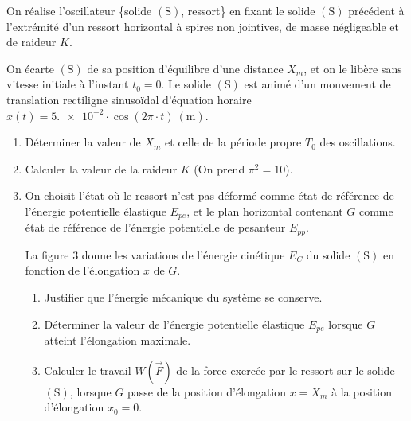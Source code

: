 On réalise l'oscillateur \{solide $\mathrm{(S)}$, ressort\} en fixant le solide
$\mathrm{(S)}$ précédent à l'extrémité d'un ressort horizontal à spires non
jointives, de masse négligeable et de raideur $K$.

On écarte $\mathrm{(S)}$ de sa position d'équilibre d'une distance $X_{m}$, et
on le libère sans vitesse initiale à l'instant $t_{0}=0$. Le solide
$\mathrm{(S)}$ est animé d'un mouvement de translation rectiligne sinusoïdal
d'équation horaire ${x(t)=\num{5.e-2}\cdot\cos(2\pi\cdot t)~(\unit{\m})}$.

\vspace{3mm}
\begin{minipage}{0.60\linewidth}
    \begin{enumerate}
        \item Déterminer la valeur de $X_{m}$ et celle de la période propre $T_{0}$
              des oscillations.
        \item Calculer la valeur de la raideur $K$ (On prend $\pi^{2}=10$).
        \item On choisit l'état où le ressort n'est pas déformé comme état de
              référence de l'énergie potentielle élastique $E_{pe}$, et le plan
              horizontal contenant $G$ comme état de référence de l'énergie
              potentielle de pesanteur $E_{pp}$.
    
              La figure 3 donne les variations de l'énergie cinétique $E_{C}$ du
              solide $\mathrm{(S)}$ en fonction de l'élongation $x$ de $G$.
              \begin{enumerate}
                  \item Justifier que l'énergie mécanique du système se conserve.
                  \item Déterminer la valeur de l'énergie potentielle élastique
                        $E_{pe}$ lorsque $G$ atteint l'élongation maximale.
                  \item Calculer le travail $W(\vec{F})$ de la force exercée par le
                        ressort sur le solide $\mathrm{(S)}$, lorsque $G$ passe de
                        la position d'élongation $x=X_{m}$ à la position
                        d'élongation $x_{0}=0$.
              \end{enumerate}
    \end{enumerate}
\end{minipage}
\hfill
